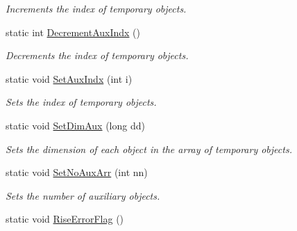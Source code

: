\begin{DoxyCompactItemize}
\begin{DoxyCompactList}\small\item\em Increments the index of temporary objects. \item\end{DoxyCompactList}\item 
\hypertarget{classDMatrix_a2211b735aecd50ed6762ed92de52a547}{
static int \hyperlink{classDMatrix_a2211b735aecd50ed6762ed92de52a547}{DecrementAuxIndx} ()}
\label{classDMatrix_a2211b735aecd50ed6762ed92de52a547}

\begin{DoxyCompactList}\small\item\em Decrements the index of temporary objects. \item\end{DoxyCompactList}\item 
\hypertarget{classDMatrix_ae65a4d724762861f0be576fccd5f9268}{
static void \hyperlink{classDMatrix_ae65a4d724762861f0be576fccd5f9268}{SetAuxIndx} (int i)}
\label{classDMatrix_ae65a4d724762861f0be576fccd5f9268}

\begin{DoxyCompactList}\small\item\em Sets the index of temporary objects. \item\end{DoxyCompactList}\item 
\hypertarget{classDMatrix_a869b844f16fb6cbd67a6ae49ce9e85ba}{
static void \hyperlink{classDMatrix_a869b844f16fb6cbd67a6ae49ce9e85ba}{SetDimAux} (long dd)}
\label{classDMatrix_a869b844f16fb6cbd67a6ae49ce9e85ba}

\begin{DoxyCompactList}\small\item\em Sets the dimension of each object in the array of temporary objects. \item\end{DoxyCompactList}\item 
\hypertarget{classDMatrix_a0206fa2a95f063d9dc2da4b3bad1bddb}{
static void \hyperlink{classDMatrix_a0206fa2a95f063d9dc2da4b3bad1bddb}{SetNoAuxArr} (int nn)}
\label{classDMatrix_a0206fa2a95f063d9dc2da4b3bad1bddb}

\begin{DoxyCompactList}\small\item\em Sets the number of auxiliary objects. \item\end{DoxyCompactList}\item 
\hypertarget{classDMatrix_afa61b704944672add882239a0c59c0c2}{
static void \hyperlink{classDMatrix_afa61b704944672add882239a0c59c0c2}{RiseErrorFlag} ()}
\label{classDMatrix_afa61b704944672add882239a0c59c0c2}


\end{DoxyCompactItemize}
